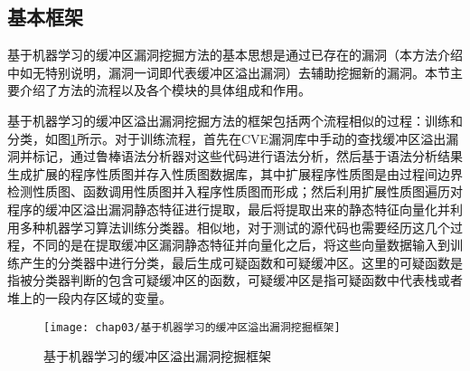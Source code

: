 {%

\subsection{基本框架}

基于机器学习的缓冲区漏洞挖掘方法的基本思想是通过已存在的漏洞{（本方法介绍中如无特别说明，漏洞一词即代表缓冲区溢出漏洞）}去辅助挖掘新的漏洞。本节主要介绍了方法的流程以及各个模块的具体组成和作用。

基于机器学习的缓冲区溢出漏洞挖掘方法的框架包括两个流程相似的过程：训练和分类，如图\ref{fig:基于机器学习的缓冲区溢出漏洞挖掘框架}所示。对于训练流程，首先在CVE漏洞库中手动的查找缓冲区溢出漏洞并标记，通过鲁棒语法分析器对这些代码进行语法分析，然后基于语法分析结果生成扩展的程序性质图并存入性质图数据库，其中扩展程序性质图是由过程间边界检测性质图、函数调用性质图并入程序性质图而形成；然后利用扩展性质图遍历对程序的缓冲区溢出漏洞静态特征进行提取，最后将提取出来的静态特征向量化并利用多种机器学习算法训练分类器。相似地，对于测试的源代码也需要经历这几个过程，不同的是在提取缓冲区漏洞静态特征并向量化之后，将这些向量数据输入到训练产生的分类器中进行分类，最后生成可疑函数和可疑缓冲区。这里的可疑函数是指被分类器判断的包含可疑缓冲区的函数，可疑缓冲区是指可疑函数中代表栈或者堆上的一段内存区域的变量。

\begin{figure}[htp]
\centering
\texttt{[image: chap03/基于机器学习的缓冲区溢出漏洞挖掘框架]}
\caption{基于机器学习的缓冲区溢出漏洞挖掘框架}
\label{fig:基于机器学习的缓冲区溢出漏洞挖掘框架}
\end{figure}

}
